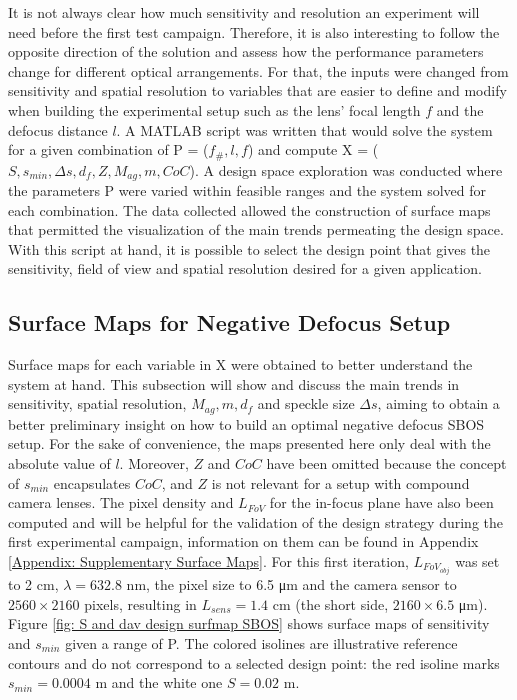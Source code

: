 \par It is not always clear how much sensitivity and resolution an experiment will need before the first test campaign. Therefore, it is also interesting to follow the opposite direction of the solution and assess how the performance parameters change for different optical arrangements. For that, the inputs were changed from sensitivity and spatial resolution to variables that are easier to define and modify when building the experimental setup such as the lens' focal length $f$ and the defocus distance $l$. A MATLAB script was written that would solve the system for a given combination of P = ($f_\#,l,f$) and compute X = ($S,s_{min},\Delta s,d_f,Z,M_{ag}, m, CoC$). A design space exploration was conducted where the parameters P were varied within feasible ranges and the system solved for each combination. The data collected allowed the construction of surface maps that permitted the visualization of the main trends permeating the design space. With this script at hand, it is possible to select the design point that gives the sensitivity, field of view and spatial resolution desired for a given application. 

\subsection{Surface Maps for Negative Defocus Setup}
\label{subsection: Surface Maps for SBOS}
\par Surface maps for each variable in X were obtained to better understand the system at hand. This subsection will show and discuss the main trends in sensitivity, spatial resolution, $M_{ag}, m, d_f$ and speckle size $\Delta s$, aiming to obtain a better preliminary insight on how to build an optimal negative defocus SBOS setup. For the sake of convenience, the maps presented here only deal with the absolute value of $l$. Moreover, $Z$ and $CoC$ have been omitted because the concept of $s_{min}$ encapsulates $CoC$, and $Z$ is not relevant for a setup with compound camera lenses. The pixel density and $L_{FoV}$ for the in-focus plane have also been computed and will be helpful for the validation of the design strategy during the first experimental campaign, information on them can be found in Appendix \ref{Appendix: Supplementary Surface Maps}. For this first iteration, $L_{FoV_{obj}}$ was set to 2 cm, $\lambda = 632.8$ nm, the pixel size to 6.5 \si{\micro\metre} and the camera sensor to $2560 \times 2160$ pixels, resulting in $L_{sens} = 1.4$ cm (the short side, $2160 \times 6.5$ \si{\micro\metre}). Figure \ref{fig: S and dav design surfmap SBOS} shows surface maps of sensitivity and $s_{min}$ given a range of P. The colored isolines are illustrative reference contours and do not correspond to a selected design point: the red isoline marks $s_{min} = 0.0004$ m and the white one $S = 0.02$ m.


